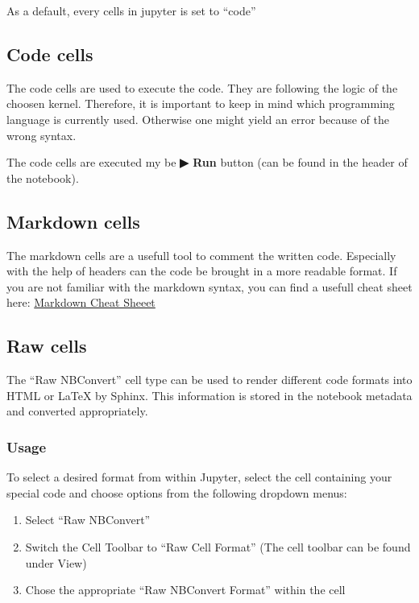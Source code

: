 \documentclass[
  letterpaper,
  DIV=11,
  numbers=noendperiod]{scrreprt}
\providecommand{\tightlist}{%
  \setlength{\itemsep}{0pt}\setlength{\parskip}{0pt}}\usepackage{longtable,booktabs,array}
\begin{document}
As a default, every cells in jupyter is set to ``code''

\subsection{Code cells}\label{code-cells}

The code cells are used to execute the code. They are following the
logic of the choosen kernel. Therefore, it is important to keep in mind
which programming language is currently used. Otherwise one might yield
an error because of the wrong syntax.

The code cells are executed my be \textbf{▶ Run} button (can be found in
the header of the notebook).

\subsection{Markdown cells}\label{markdown-cells}

The markdown cells are a usefull tool to comment the written code.
Especially with the help of headers can the code be brought in a more
readable format. If you are not familiar with the markdown syntax, you
can find a usefull cheat sheet here:
\href{https://www.ibm.com/docs/en/db2-event-store/2.0.0?topic=notebooks-markdown-jupyter-cheatsheet}{Markdown
Cheat Sheeet}

\subsection{Raw cells}\label{raw-cells}

The ``Raw NBConvert'' cell type can be used to render different code
formats into HTML or LaTeX by Sphinx. This information is stored in the
notebook metadata and converted appropriately.

\subsubsection{Usage}\label{usage}

To select a desired format from within Jupyter, select the cell
containing your special code and choose options from the following
dropdown menus:

\begin{enumerate}
\def\labelenumi{\arabic{enumi}.}
\tightlist
\item
  Select ``Raw NBConvert''
\item
  Switch the Cell Toolbar to ``Raw Cell Format'' (The cell toolbar can
  be found under View)
\item
  Chose the appropriate ``Raw NBConvert Format'' within the cell
\end{enumerate}
\end{document}
